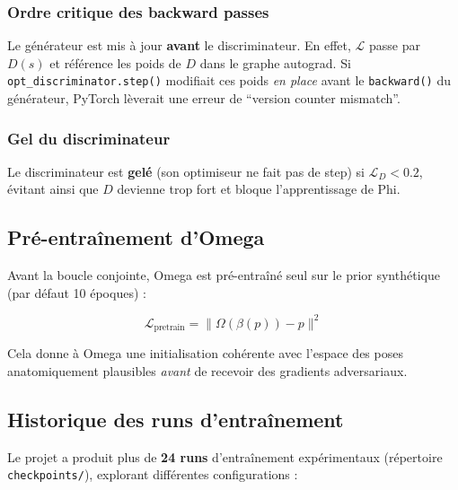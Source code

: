 \documentclass[12pt,a4paper]{article}
\begin{document}
\subsubsection*{Ordre critique des backward passes}

\begin{warnbox}
  Le générateur est mis à jour \textbf{avant} le discriminateur. En effet,
  $\mathcal{L}$ passe par $D(s)$ et référence les poids de $D$ dans le graphe
  autograd. Si \texttt{opt\_discriminator.step()} modifiait ces poids \emph{en
  place} avant le \texttt{backward()} du générateur, PyTorch lèverait une erreur
  de ``version counter mismatch''.
\end{warnbox}

\subsubsection*{Gel du discriminateur}

Le discriminateur est \textbf{gelé} (son optimiseur ne fait pas de step) si
$\mathcal{L}_D < 0.2$, évitant ainsi que $D$ devienne trop fort et bloque
l'apprentissage de Phi.

\subsection{Pré-entraînement d'Omega}

Avant la boucle conjointe, Omega est pré-entraîné seul sur le prior synthétique
(par défaut 10 époques) :

\begin{equation}
  \mathcal{L}_{\text{pretrain}} = \|\Omega(\beta(p)) - p\|^2
\end{equation}

Cela donne à Omega une initialisation cohérente avec l'espace des poses
anatomiquement plausibles \emph{avant} de recevoir des gradients adversariaux.

\subsection{Historique des runs d'entraînement}

Le projet a produit plus de \textbf{24 runs} d'entraînement expérimentaux
(répertoire \texttt{checkpoints/}), explorant différentes configurations :
\end{document}
